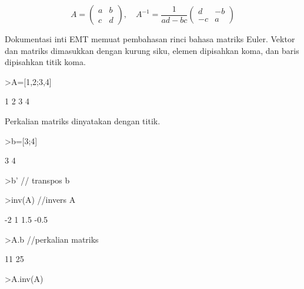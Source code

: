 \documentclass[a4paper,10pt]{article}
\begin{document}
\begin{eulernotebook}
\begin{eulercomment}
\begin{eulercomment}
\begin{eulercomment}
\begin{eulercomment}
\begin{eulercomment}
\begin{eulercomment}
\begin{eulercomment}
\begin{eulercomment}
\begin{eulercomment}
\begin{eulercomment}
\begin{eulercomment}
\begin{eulercomment}
\begin{eulercomment}
\end{eulercomment}
\begin{eulerformula}
\[
A=\begin{pmatrix}a&b\\c&d\end{pmatrix},\quad A^{-1}=\frac{1}{ad-bc}\begin{pmatrix}d&-b\\-c&a\end{pmatrix}
\]
\end{eulerformula}
\begin{eulercomment}
Dokumentasi inti EMT memuat pembahasan rinci bahasa matriks Euler. Vektor
dan matriks dimasukkan dengan kurung siku, elemen dipisahkan koma, dan baris
dipisahkan titik koma.
\end{eulercomment}
\begin{eulerprompt}
>A=[1,2;3,4]
\end{eulerprompt}
\begin{euleroutput}
              1             2 
              3             4 
\end{euleroutput}
\begin{eulercomment}
Perkalian matriks dinyatakan dengan titik.
\end{eulercomment}
\begin{eulerprompt}
>b=[3;4]
\end{eulerprompt}
\begin{euleroutput}
              3 
              4 
\end{euleroutput}
\begin{eulerprompt}
>b' // transpos b
\end{eulerprompt}
\begin{euleroutput}
  [3,  4]
\end{euleroutput}
\begin{eulerprompt}
>inv(A) //invers A
\end{eulerprompt}
\begin{euleroutput}
             -2             1 
            1.5          -0.5 
\end{euleroutput}
\begin{eulerprompt}
>A.b //perkalian matriks
\end{eulerprompt}
\begin{euleroutput}
             11 
             25 
\end{euleroutput}
\begin{eulerprompt}
>A.inv(A)
\end{eulerprompt}
\begin{euleroutput}

\end{euleroutput}
\end{eulercomment}
\end{eulercomment}
\end{eulercomment}
\end{eulercomment}
\end{eulercomment}
\end{eulercomment}
\end{eulercomment}
\end{eulercomment}
\end{eulercomment}
\end{eulercomment}
\end{eulercomment}
\end{eulercomment}
\end{eulernotebook}
\end{document}
